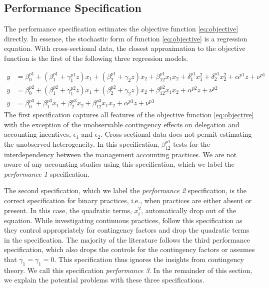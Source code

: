 \documentclass[12pt]{article}
\begin{document}
\subsection{Performance Specification}

The performance specification estimates the objective function \eqref{eq:objective} directly. In essence, the stochastic form of function \eqref{eq:objective} is a regression equation. With cross-sectional data, the closest approximation to the objective function is the first of the following three regression models.  

\begin{align*}
y &=  \beta^{p1}_0 + (\beta^{p1}_{1} + \gamma_1^{p1} z )x_1 
						+ (\beta_{2}^{p1} + \gamma_2 z ) x_2 
                        + \beta_{12}^{p1} x_1 x_2 
                        + \delta_1^{p1} x^2_1 + \delta_2^{p1} x^2_2 
                        + \alpha^{p1} z
                        + \nu^{p1} \\
 y &=  \beta^{p2}_0 + (\beta^{p2}_{1} + \gamma_1^{p2} z )x_1 
						+ (\beta_{2}^{p2} + \gamma_2 z ) x_2 
                        + \beta_{12}^{p2} x_1 x_2 
                        + \alpha^{p2} z
                        + \nu^{p2} \\
 y &=  \beta^{p3}_0 + \beta^{p3}_{1} x_1 
						+ \beta_{2}^{p3} x_2 
                        + \beta_{12}^{p3} x_1 x_2 
                        + \alpha^{p3} z
                        + \nu^{p3}
\end{align*}
The first specification captures all features of the objective function \eqref{eq:objective} with the exception of the unobservable contingency effects on delegation and accounting incentives, $\epsilon_1$ and $\epsilon_2$. Cross-sectional data does not permit estimating the unobserved heterogeneity. In this specification, \(\beta_{12}^{p1}\) tests for the interdependency between the management accounting practices. We are not aware of any accounting studies using this specification, which we label the \emph{performance 1} specification. 

The second specification, which we label the \emph{performance 2} specification, is the correct specification for binary practices, i.e., when practices are either absent or present. In this case, the quadratic terms, $x_i^2$, automatically drop out of the equation. While investigating continuous practices, \citet{ bedford_management_2016, bedford_performance_2019} follow this specification as they control appropriately for contingency factors and drop the quadratic terms in the specification. The majority of the literature follows the third performance specification, which also drops the controls for the contingency factors or assumes that $\gamma_1 = \gamma_1 = 0$. This specification thus ignores the insights from contingency theory. We call this specification \emph{performance 3}. In the remainder of this section, we explain the potential problems with these three specifications.
\end{document}

